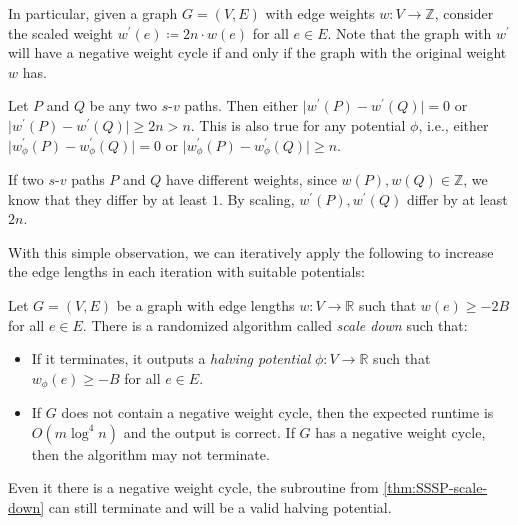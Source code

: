 In particular, given a graph \(G = (V, E)\) with edge weights \(w \colon V \to \mathbb{Z} \), consider the scaled weight \(w^{\prime} (e) \coloneqq 2n \cdot w(e)\) for all \(e \in E\). Note that the graph with \(w^{\prime} \) will have a negative weight cycle if and only if the graph with the original weight \(w\) has.

\begin{claim}
	Let \(P\) and \(Q\) be any two \(s\)-\(v\) paths. Then either \(\lvert w^{\prime} (P) - w^{\prime} (Q) \rvert = 0\) or \(\lvert w^{\prime} (P) - w^{\prime} (Q) \rvert \geq 2n > n\). This is also true for any potential \(\phi \), i.e., either \(\lvert w^{\prime} _\phi (P) - w^{\prime} _\phi (Q) \rvert = 0\) or \(\lvert w^{\prime} _\phi (P) - w^{\prime} _\phi (Q) \rvert \geq n\).
\end{claim}
\begin{explanation}
	If two \(s\)-\(v\) paths \(P\) and \(Q\) have different weights, since \(w(P) , w(Q) \in \mathbb{Z} \), we know that they differ by at least \(1\). By scaling, \(w^{\prime} (P), w^{\prime} (Q)\) differ by at least \(2n\).
\end{explanation}

With this simple observation, we can iteratively apply the following to increase the edge lengths in each iteration with suitable potentials:

\begin{theorem}\label{thm:SSSP-scale-down}
	Let \(G = (V, E)\) be a graph with edge lengths \(w\colon V \to \mathbb{R} \) such that \(w(e) \geq -2B\) for all \(e \in E\). There is a randomized algorithm called \emph{scale down} such that:
	\begin{itemize}
		\item If it terminates, it outputs a \emph{halving potential} \(\phi \colon V \to \mathbb{R} \) such that \(w_{\phi }(e) \geq -B\) for all \(e \in E\).
		\item If \(G\) does not contain a negative weight cycle, then the expected runtime is \(O(m \log ^4 n)\) and the output is correct. If \(G\) has a negative weight cycle, then the algorithm may not terminate.
	\end{itemize}
\end{theorem}

\begin{note}
	Even it there is a negative weight cycle, the subroutine from \autoref{thm:SSSP-scale-down} can still terminate and will be a valid halving potential.
\end{note}

